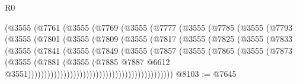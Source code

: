 \begin{lexlean}{R0}
\begin{coremodule}
                          (@3555
                            (@7761
                              (@3555
                                (@7769
                                  (@3555
                                    (@7777
                                      (@3555
                                        (@7785
                                          (@3555
                                            (@7793
                                              (@3555
                                                (@7801
                                                  (@3555
                                                    (@7809
                                                      (@3555
                                                        (@7817
                                                          (@3555
                                                            (@7825
                                                              (@3555
                                                                (@7833
                                                                  (@3555
                                                                    (@7841
                                                                      (@3555
                                                                        (@7849
                                                                          (@3555
                                                                            (@7857
                                                                              (@3555
                                                                                (@7865
                                                                                  (@3555
                                                                                    (@7873
                                                                                      (@3555
                                                                                        (@7881
                                                                                          (@3555
                                                                                            (@7885
                                                                                              @7887
                                                                                              @6612
                                                                                              @3551)))))))))))))))))))))))))))))))))))))))))))))
@8103 := @7645

\end{coremodule}
\end{lexlean}
